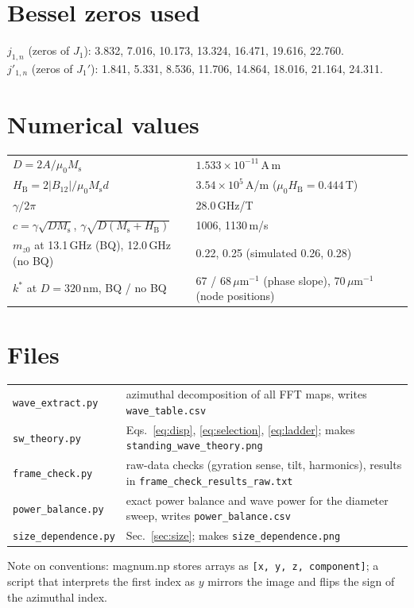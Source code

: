 \documentclass[11pt,a4paper]{article}
\newcommand{\Ms}{M_\mathrm{s}}
\newcommand{\HB}{H_\mathrm{B}}
\begin{document}
\section{Bessel zeros used}
$j_{1,n}$ (zeros of $J_1$): 3.832, 7.016, 10.173, 13.324, 16.471, 19.616, 22.760.\\
$j'_{1,n}$ (zeros of $J_1'$): 1.841, 5.331, 8.536, 11.706, 14.864, 18.016, 21.164, 24.311.

\section{Numerical values}
\begin{tabular}{p{}p{}}
$D=2A/\mu_0\Ms$ & $1.533\times10^{-11}$\,A\,m\\
$\HB=2|B_{12}|/\mu_0\Ms d$ & $3.54\times10^{5}$\,A/m ($\mu_0\HB=0.444$\,T)\\
$\gamma/2\pi$ & 28.0\,GHz/T\\
$c=\gamma\sqrt{D\Ms}$, $\gamma\sqrt{D(\Ms+\HB)}$ & 1006, 1130\,m/s\\
$m_{z0}$ at 13.1\,GHz (BQ), 12.0\,GHz (no BQ) & 0.22, 0.25 (simulated 0.26, 0.28)\\
$k^\ast$ at $D=320$\,nm, BQ / no BQ & 67 / 68\,$\mu$m$^{-1}$ (phase slope), 70\,$\mu$m$^{-1}$ (node positions)\\
\end{tabular}

\section{Files}
\begin{tabular}{p{}p{}}
\texttt{wave\_extract.py} & azimuthal decomposition of all FFT maps, writes \texttt{wave\_table.csv}\\
\texttt{sw\_theory.py} & Eqs.~\eqref{eq:disp}, \eqref{eq:selection}, \eqref{eq:ladder}; makes \texttt{standing\_wave\_theory.png}\\
\texttt{frame\_check.py} & raw-data checks (gyration sense, tilt, harmonics), results in \texttt{frame\_check\_results\_raw.txt}\\
\texttt{power\_balance.py} & exact power balance and wave power for the diameter sweep, writes \texttt{power\_balance.csv}\\
\texttt{size\_dependence.py} & Sec.~\ref{sec:size}; makes \texttt{size\_dependence.png}\\
\end{tabular}

Note on conventions: magnum.np stores arrays as \texttt{[x, y, z, component]}; a script that interprets the first
index as $y$ mirrors the image and flips the sign of the azimuthal index.
\end{document}

